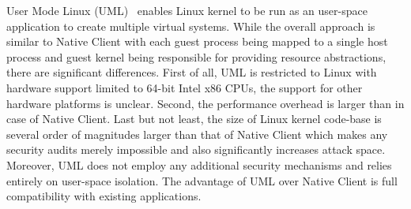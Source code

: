 User Mode Linux (UML)~\cite{uml:linux06} enables Linux kernel to be run as
an user-space application to create multiple virtual systems. While the
overall approach is similar to Native Client with each guest process being
mapped to a single host process and guest kernel being responsible for
providing resource abstractions, there are significant differences.
First of all, UML is restricted to Linux with hardware support limited
to 64-bit Intel x86 CPUs, the support for other hardware platforms is
unclear. Second, the performance overhead is larger than in case of
Native Client. Last but not least, the size of Linux kernel code-base is
several order of magnitudes larger than that of Native Client which
makes any security audits merely impossible and also significantly
increases attack space. Moreover, UML does not employ any additional
security mechanisms and relies entirely on user-space isolation. The
advantage of UML over Native Client is full compatibility with existing
applications.

\cite{heiser:hotos11}
\cite{tanenbaum:osdi08}
\cite{engler:sosp95}
\cite{yee:ieee-sp09}
\cite{sehr:usenix-sec10}
\cite{ansel:pldi11}
\cite{donovan:pnacl10}

